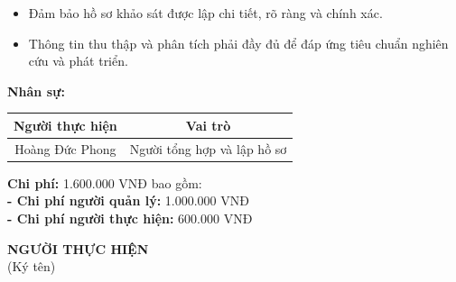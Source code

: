 {\begin{minipage}{\textwidth}
\begin{itemize}
            \item Đảm bảo hồ sơ khảo sát được lập chi tiết, rõ ràng và chính xác.
            \item Thông tin thu thập và phân tích phải đầy đủ để đáp ứng tiêu chuẩn nghiên cứu và phát triển.
        \end{itemize}
        \noindent \textbf{Nhân sự:}
        \begin{longtable}{|c|c|}
        \hline
        \textbf{Người thực hiện} & \textbf{Vai trò} \\
        \hline
        Hoàng Đức Phong & Người tổng hợp và lập hồ sơ \\
        \hline
        \end{longtable}
        \noindent \textbf{Chi phí:} 1.600.000 VNĐ bao gồm:\\
        \noindent \textbf{  - Chi phí người quản lý:} 1.000.000 VNĐ\\
        \noindent \textbf{  - Chi phí người thực hiện:} 600.000 VNĐ
        \begin{flushleft}
            \hspace{8cm} \textbf{NGƯỜI THỰC HIỆN} \\
            \hspace{9.5cm} (Ký tên) \\
            \vspace{1cm}
        \end{flushleft}
    \end{minipage}
}
